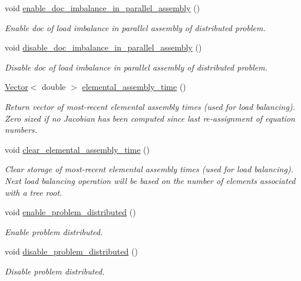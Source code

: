 \begin{DoxyCompactItemize}
void \hyperlink{classoomph_1_1Problem_a577bca9cc5ee9504480b372f82e924dd}{enable\+\_\+doc\+\_\+imbalance\+\_\+in\+\_\+parallel\+\_\+assembly} ()
\begin{DoxyCompactList}\small\item\em Enable doc of load imbalance in parallel assembly of distributed problem. \end{DoxyCompactList}\item 
void \hyperlink{classoomph_1_1Problem_a9365d2b0057089ae5551b97488a3a62a}{disable\+\_\+doc\+\_\+imbalance\+\_\+in\+\_\+parallel\+\_\+assembly} ()
\begin{DoxyCompactList}\small\item\em Disable doc of load imbalance in parallel assembly of distributed problem. \end{DoxyCompactList}\item 
\hyperlink{classoomph_1_1Vector}{Vector}$<$ double $>$ \hyperlink{classoomph_1_1Problem_aa8da092e78c9af112580ddb667a15d97}{elemental\+\_\+assembly\+\_\+time} ()
\begin{DoxyCompactList}\small\item\em Return vector of most-\/recent elemental assembly times (used for load balancing). Zero sized if no Jacobian has been computed since last re-\/assignment of equation numbers. \end{DoxyCompactList}\item 
void \hyperlink{classoomph_1_1Problem_a07bad546a91f9d13936be6dc0590fcd0}{clear\+\_\+elemental\+\_\+assembly\+\_\+time} ()
\begin{DoxyCompactList}\small\item\em Clear storage of most-\/recent elemental assembly times (used for load balancing). Next load balancing operation will be based on the number of elements associated with a tree root. \end{DoxyCompactList}\item 
void \hyperlink{classoomph_1_1Problem_a3fe4edae6a97460405e7f667d7d4f406}{enable\+\_\+problem\+\_\+distributed} ()
\begin{DoxyCompactList}\small\item\em Enable problem distributed. \end{DoxyCompactList}\item 
void \hyperlink{classoomph_1_1Problem_a79752d23035158783ad19711027984dc}{disable\+\_\+problem\+\_\+distributed} ()
\begin{DoxyCompactList}\small\item\em Disable problem distributed. \end{DoxyCompactList}\item 

\end{DoxyCompactItemize}

